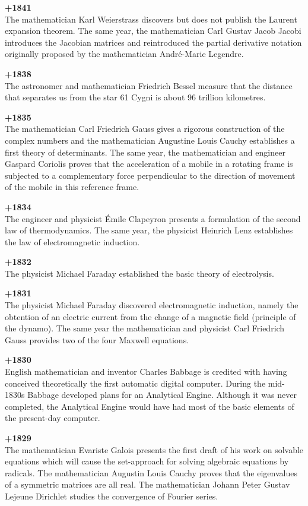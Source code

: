 \textbf{+1841}\\
The mathematician Karl Weierstrass discovers but does not publish the Laurent expansion theorem. The same year, the mathematician Carl Gustav Jacob Jacobi introduces the Jacobian matrices and reintroduced the partial derivative notation originally proposed by the mathematician André-Marie Legendre.

\textbf{+1838}\\
The astronomer and mathematician Friedrich Bessel measure that the distance that separates us from the star 61 Cygni is about 96 trillion kilometres.

\textbf{+1835}\\
The mathematician Carl Friedrich Gauss gives a rigorous construction of the complex numbers and the mathematician Augustine Louis Cauchy establishes a first theory of determinants. The same year, the mathematician and engineer Gaspard Coriolis proves that the acceleration of a mobile in a rotating frame is subjected to a complementary force perpendicular to the direction of movement of the mobile in this reference frame.

\textbf{+1834}\\
The engineer and physicist Émile Clapeyron presents a formulation of the second law of thermodynamics. The same year, the physicist Heinrich Lenz establishes the law of electromagnetic induction.

\textbf{+1832}\\
The physicist Michael Faraday established the basic theory of electrolysis.

\textbf{+1831}\\
The physicist Michael Faraday discovered electromagnetic induction, namely the obtention of an electric current from the change of a magnetic field (principle of the dynamo). The same year the mathematician and physicist Carl Friedrich Gauss provides two of the four Maxwell equations.

\textbf{+1830}\\
English mathematician and inventor Charles Babbage is credited with having conceived theoretically the first automatic digital computer. During the mid-1830s Babbage developed plans for an Analytical Engine. Although it was never completed, the Analytical Engine would have had most of the basic elements of the present-day computer.

\textbf{+1829}\\
The mathematician Evariste Galois presents the first draft of his work on solvable equations which will cause the set-approach for solving algebraic equations by radicals. The mathematician Augustin Louis Cauchy proves that the eigenvalues of a symmetric matrices are all real. The mathematician Johann Peter Gustav Lejeune Dirichlet studies the convergence of Fourier series.

